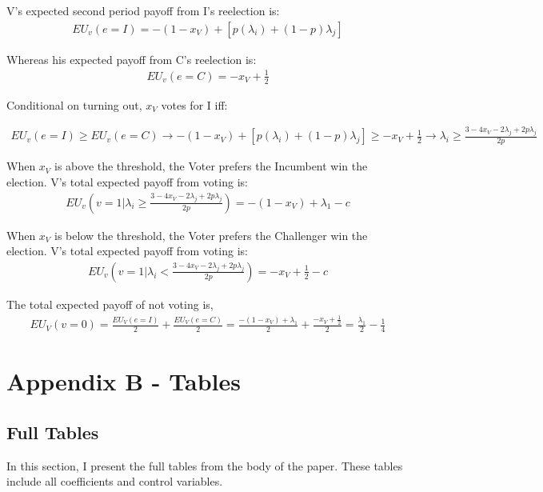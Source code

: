 \documentclass[12pt]{paper}
\begin{document}
V’s expected second period payoff from I’s reelection is: 
\begin{gather}
EU_v(e = I) = -(1 - x_V) + [p(\lambda_i) + (1-p)\lambda_j] 
\end{gather}

Whereas his expected payoff from C's reelection is:
\begin{gather}
EU_v(e = C) = -x_V + \frac{1}{2}
\end{gather}

Conditional on turning out, $x_V$ votes for I iff:

\begin{gather}
EU_v(e = I) \geq EU_v(e = C) \rightarrow 
-(1 - x_V) + [p(\lambda_i) + (1-p)\lambda_j] \geq -x_V + \frac{1}{2} \rightarrow 
\lambda_i \geq \frac{3 - 4x_V - 2\lambda_j + 2p\lambda_j}{2p}
\end{gather}

When $x_V$ is above the threshold, the Voter prefers the Incumbent win the election. V's total expected payoff from voting is:
\begin{gather}
EU_v(v = 1 | \lambda_i \geq \frac{3 - 4x_V - 2\lambda_j + 2p\lambda_j}{2p}) =
-(1 - x_V) + \lambda_1 - c
\end{gather}

When $x_V$ is below the threshold, the Voter prefers the Challenger win the election. V's total expected payoff from voting is:
\begin{gather}
EU_v(v = 1 | \lambda_i < \frac{3 - 4x_V - 2\lambda_j + 2p\lambda_j}{2p}) = 
-x_V + \frac{1}{2} - c
\end{gather}

The total expected payoff of not voting is,
\begin{gather}
EU_V (v=0) = \frac{EU_V (e=I)}{2} + \frac{EU_V (e=C)}{2} =
 \frac{- (1 - x_V ) + \lambda_1}{2} + \frac{-x_V + \frac{1}{2}}{2} = 
 \frac{\lambda_1}{2} - \frac{1}{4}
\end{gather}

\clearpage

\section*{Appendix B - Tables}
\subsection*{Full Tables}
In this section, I present the full tables from the body of the paper. These tables include all coefficients and control variables.
\end{document}
